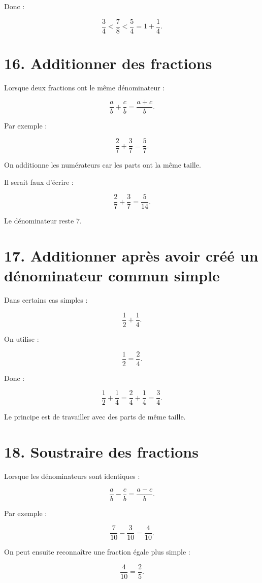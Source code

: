 Donc :

\[
\boxed{
\dfrac{3}{4}
<
\dfrac{7}{8}
<
\dfrac{5}{4}
=
1+\dfrac{1}{4}
}.
\]

\section{16. Additionner des fractions}

Lorsque deux fractions ont le même dénominateur :

\[
\dfrac{a}{b}+\dfrac{c}{b}
=
\dfrac{a+c}{b}.
\]

Par exemple :

\[
\dfrac{2}{7}+\dfrac{3}{7}
=
\dfrac{5}{7}.
\]

On additionne les numérateurs car les parts ont la même taille.

Il serait faux d’écrire :

\[
\dfrac{2}{7}+\dfrac{3}{7}
=
\dfrac{5}{14}.
\]

Le dénominateur reste $7$.

\section{17. Additionner après avoir créé un dénominateur commun simple}

Dans certains cas simples :

\[
\dfrac{1}{2}+\dfrac{1}{4}.
\]

On utilise :

\[
\dfrac{1}{2}=\dfrac{2}{4}.
\]

Donc :

\[
\dfrac{1}{2}+\dfrac{1}{4}
=
\dfrac{2}{4}+\dfrac{1}{4}
=
\dfrac{3}{4}.
\]

Le principe est de travailler avec des parts de même taille.

\section{18. Soustraire des fractions}

Lorsque les dénominateurs sont identiques :

\[
\dfrac{a}{b}-\dfrac{c}{b}
=
\dfrac{a-c}{b}.
\]

Par exemple :

\[
\dfrac{7}{10}-\dfrac{3}{10}
=
\dfrac{4}{10}.
\]

On peut ensuite reconnaître une fraction égale plus simple :

\[
\dfrac{4}{10}=\dfrac{2}{5}.
\]

